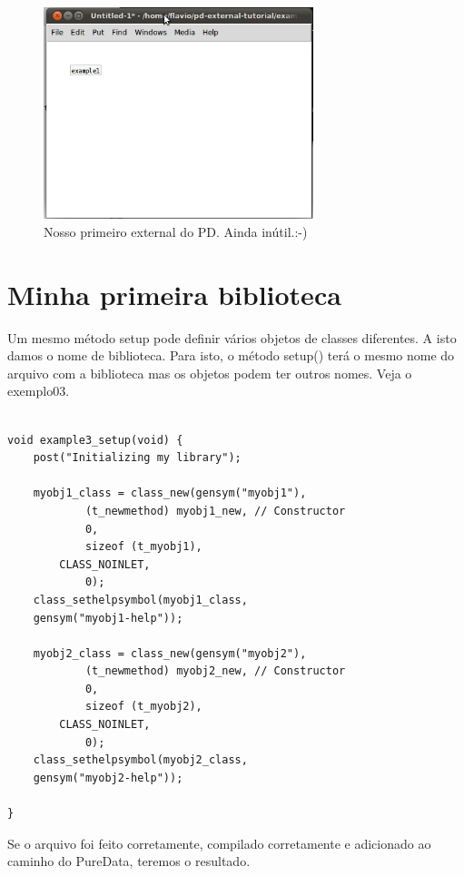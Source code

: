 \documentclass[10pt,a4paper]{report}
\begin{document}
\begin{figure}[h!]
	\centering
	\includegraphics[width=0.7\textwidth]{example1}
	\caption{Nosso primeiro external do PD. Ainda inútil.:-)}
\end{figure}

\section{Minha primeira biblioteca}

Um mesmo método setup pode definir vários objetos de classes diferentes. A isto damos o nome de biblioteca. Para isto, o método setup() terá o mesmo nome do arquivo com a biblioteca mas os objetos podem ter outros nomes. Veja o exemplo03.

\begin{lstlisting}

void example3_setup(void) {
    post("Initializing my library");

    myobj1_class = class_new(gensym("myobj1"),
            (t_newmethod) myobj1_new, // Constructor
            0,
            sizeof (t_myobj1),
	    CLASS_NOINLET,
            0);
    class_sethelpsymbol(myobj1_class, 
	gensym("myobj1-help"));

    myobj2_class = class_new(gensym("myobj2"),
            (t_newmethod) myobj2_new, // Constructor
            0,
            sizeof (t_myobj2),
	    CLASS_NOINLET,
            0);
    class_sethelpsymbol(myobj2_class, 
	gensym("myobj2-help"));

}
\end{lstlisting}

Se o arquivo foi feito corretamente, compilado corretamente e adicionado ao caminho do PureData, teremos o resultado.
\end{document}
